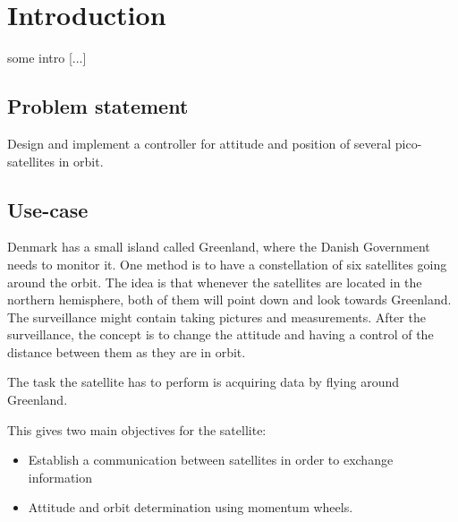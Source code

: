 \chapter{Introduction}\label{chap:Introduction}
%
\cite{Biezl}
some intro [...]

%
\section{Problem statement}
%
Design and implement a controller for attitude and position of several pico-satellites in orbit.
%
\section{Use-case}\label{sec:useCase}
%
Denmark has a small island called Greenland, where the Danish Government needs to monitor it.
One method is to have a constellation of six satellites going around the orbit. The idea is that whenever the satellites are located in the northern hemisphere, both of them will point down and look towards Greenland. The surveillance might contain taking pictures and measurements. After the surveillance, the concept is to change the attitude and having a control of the distance between them as they are in orbit.

The task the satellite has to perform is acquiring data by flying around Greenland.

This gives two main objectives for the satellite: 
\vspace{-0.5cm}
\begin{itemize}
	\item Establish a communication between satellites in order to exchange information
	\item Attitude and orbit determination using momentum wheels.
\end{itemize}
%